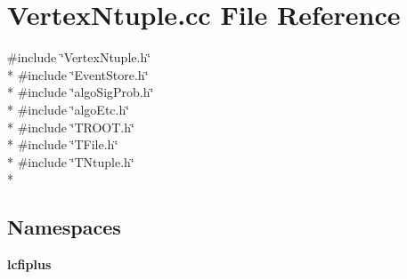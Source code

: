 \section{Vertex\-Ntuple.\-cc File Reference}
\label{VertexNtuple_8cc}
{\ttfamily \#include \char`\"{}Vertex\-Ntuple.\-h\char`\"{}}\\*
{\ttfamily \#include \char`\"{}Event\-Store.\-h\char`\"{}}\\*
{\ttfamily \#include \char`\"{}algo\-Sig\-Prob.\-h\char`\"{}}\\*
{\ttfamily \#include \char`\"{}algo\-Etc.\-h\char`\"{}}\\*
{\ttfamily \#include \char`\"{}T\-R\-O\-O\-T.\-h\char`\"{}}\\*
{\ttfamily \#include \char`\"{}T\-File.\-h\char`\"{}}\\*
{\ttfamily \#include \char`\"{}T\-Ntuple.\-h\char`\"{}}\\*
\subsection*{Namespaces}
\begin{DoxyCompactItemize}
\item 
{\bf lcfiplus}
\end{DoxyCompactItemize}
